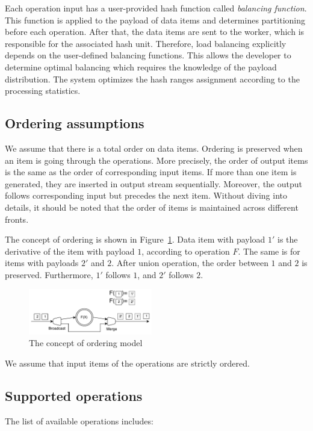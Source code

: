 Each operation input has a user-provided hash function called {\it balancing function}. This function is applied to the payload of data items and determines partitioning before each operation. After that, the data items are sent to the worker, which is responsible for the associated hash unit. Therefore, load balancing explicitly depends on the user-defined balancing functions. This allows the developer to determine optimal balancing which requires the knowledge of the payload distribution. The system optimizes the hash ranges assignment according to the processing statistics. 

\subsection{Ordering assumptions}
We assume that there is a total order on data items. Ordering is preserved when an item is going through the operations. More precisely, the order of output items is the same as the order of corresponding input items. If more than one item is generated, they are inserted in output stream sequentially. Moreover, the output follows corresponding input but precedes the next item. Without diving into details, it should be noted that the order of items is maintained across different fronts.

The concept of ordering is shown in Figure~\ref{ordering}. Data item with payload $1'$ is the derivative of the item with payload $1$, according to operation $F$. The same is for items with payloads $2'$ and $2$. After union operation, the order between $1$ and $2$ is preserved. Furthermore, $1'$ follows $1$, and $2'$ follows $2$.  
\begin{figure}[htbp]
  \centering
  \includegraphics[width=0.48\textwidth]{pics/ordering}
  \caption{The concept of ordering model}
  \label {ordering}
\end{figure}

We assume that input items of the operations are strictly ordered.

\subsection{Supported operations}
The list of available operations includes:

